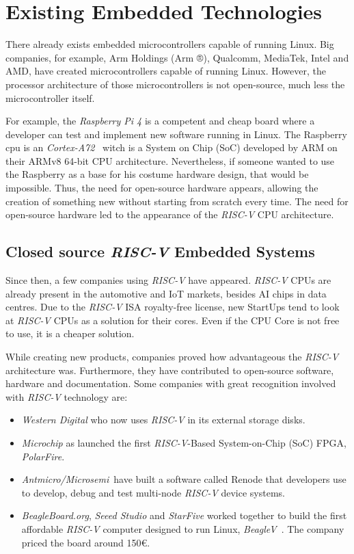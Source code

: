 \chapter{Existing Embedded Technologies}
\label{chapter:existing_embedded_technologies}
There already exists embedded microcontrollers capable of running Linux. Big companies, for example, Arm Holdings (Arm ®), Qualcomm, MediaTek, Intel and AMD, have created microcontrollers capable of running Linux. However, the processor architecture of those microcontrollers is not open-source, much less the microcontroller itself.

For example, the \textit{Raspberry Pi 4} is a competent and cheap board where a developer can test and implement new software running in Linux. The Raspberry \acrshort{cpu} is an \textit{Cortex-A72}~\cite{cortex_a72} witch is a System on Chip (SoC) developed by ARM on their ARMv8 64-bit CPU architecture. Nevertheless, if someone wanted to use the Raspberry as a base for his costume hardware design, that would be impossible. Thus, the need for open-source hardware appears, allowing the creation of something new without starting from scratch every time. The need for open-source hardware led to the appearance of the \textit{RISC-V} CPU architecture.


\section{Closed source \textit{RISC-V} Embedded Systems}
\label{section:closed_source}
Since then, a few companies using \textit{RISC-V} have appeared. \textit{RISC-V} CPUs are already present in the automotive and IoT markets, besides AI chips in data centres. Due to the \textit{RISC-V} ISA royalty-free license, new StartUps tend to look at \textit{RISC-V} CPUs as a solution for their cores. Even if the CPU Core is not free to use, it is a cheaper solution.

While creating new products, companies proved how advantageous the \textit{RISC-V} architecture was. Furthermore, they have contributed to open-source software, hardware and documentation. Some companies with great recognition involved with \textit{RISC-V} technology are:
\begin{itemize}
    \item \textit{Western Digital} who now uses \textit{RISC-V} in its external storage disks.
    \item \textit{Microchip} as launched the first \textit{RISC-V}-Based System-on-Chip (SoC) FPGA, \textit{PolarFire}.
    \item \textit{Antmicro/Microsemi}~\footnotemark have built a software called Renode that developers use to develop, debug and test multi-node \textit{RISC-V} device systems.
    \item \textit{BeagleBoard.org}, \textit{Seeed Studio} and \textit{StarFive} worked together to build the first affordable \textit{RISC-V} computer designed to run Linux, \textit{BeagleV}~\cite{beagleV}. The company priced the board around 150€.
\end{itemize}

